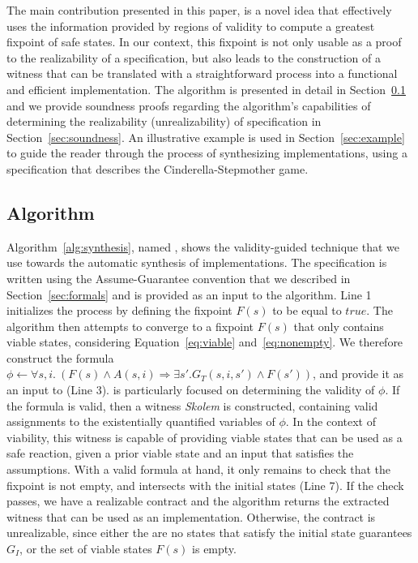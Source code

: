 The main contribution presented in this paper, is a novel idea that effectively
uses the information provided by regions of validity to compute a
greatest fixpoint of safe states. In our context, this fixpoint is not only
usable as a proof to the realizability of a specification, but also leads to the
construction of a witness that can be translated with a straightforward process
into a functional and efficient implementation. The algorithm is
presented in detail in Section~\ref{sec:alg} and we provide soundness
proofs regarding the algorithm's capabilities of determining the
realizability (unrealizability) of specification in
Section~\ref{sec:soundness}. An illustrative example is used in
Section~\ref{sec:example} to guide the reader through the process of
synthesizing implementations, using a specification that describes the Cinderella-Stepmother game.

\subsection{Algorithm}
\label{sec:alg}
Algorithm~\ref{alg:synthesis}, named \jsynvg, shows the validity-guided technique that we use towards the automatic synthesis of implementations. The specification is written using the Assume-Guarantee convention that we described in Section~\ref{sec:formals} and is provided as an input to the algorithm.
Line 1 initializes the process by defining the fixpoint $F(s)$ to be equal to
$true$. The algorithm then attempts to converge to a fixpoint $F(s)$
that only contains viable states, considering Equation~\ref{eq:viable}
and~\ref{eq:nonempty}.
We therefore construct the formula $\phi \gets \forall s,i. \ (F(s) \land A(s,i)
\Rightarrow \exists s'. G_{T}(s,i,s') \land F(s'))$, and provide it as an input to \aeval (Line 3). \aeval is particularly
focused on determining the validity of $\phi$. If the formula is valid, then a witness
\textit{Skolem} is constructed, containing valid assignments to the
existentially quantified variables of $\phi$. In the context of viability, this
witness is capable of providing viable states that can be used as a safe
reaction, given a prior viable state and an input that
satisfies the assumptions. With a valid formula at hand, it only remains to check that the fixpoint is not empty, and intersects with the initial states (Line 7).
If the check passes, we have a realizable contract and the algorithm returns the extracted witness that can be used as an implementation. Otherwise, the contract is unrealizable, since either the are no states that satisfy the
initial state guarantees $G_I$, or the set of viable states $F(s)$ is empty.

